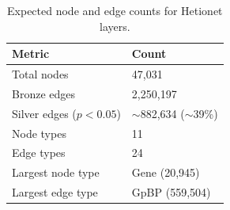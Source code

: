 \begin{table}[H]
\centering
\renewcommand{\arraystretch}{1.2}
\begin{tabular}{|l|l|}
\hline
\textbf{Metric} & \textbf{Count} \\ \hline
Total nodes & 47,031 \\ \hline
Bronze edges & 2,250,197 \\ \hline
Silver edges ($p < 0.05$) & $\sim$882,634 ($\sim$39\%) \\ \hline
Node types & 11 \\ \hline
Edge types & 24 \\ \hline
Largest node type & Gene (20,945) \\ \hline
Largest edge type & GpBP (559,504) \\ \hline
\end{tabular}
\caption{Expected node and edge counts for Hetionet layers.}
\end{table}